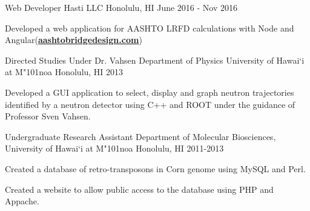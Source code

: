 \begin{cventries}
    \cventry
    {Web Developer}
    {Hasti LLC}
    {Honolulu, HI}
    {June 2016 - Nov 2016}
    {
        \begin{cvitems}
            \item {Developed a web application for AASHTO LRFD calculations with Node and Angular(\textbf{\href{http://www.aashtobridgedesign.com}{aashtobridgedesign.com}})}
        \end{cvitems}
    }

	
	\cventry
	{Directed Studies Under Dr. Vahsen}
	{Department of Physics University of Hawai`i at M{\char"101}noa}
	{Honolulu, HI}
	{2013}
	{
		\begin{cvitems}
			\item {Developed a GUI application to select, display and graph neutron trajectories identified by a neutron detector using C++ and
				ROOT under the guidance of Professor Sven Vahsen.}
		\end{cvitems}
	}

	\cventry
	{Undergraduate Research Assistant}
	{Department of Molecular Biosciences, University of Hawai`i at M{\char"101}noa}
	{Honolulu, HI}
	{2011-2013}
	{
		\begin{cvitems}
			\item {Created a database of retro-transposons in Corn genome using MySQL and Perl.}
			\item {Created a website to allow public access to the database using PHP and Appache.}
		\end{cvitems}
	}

\end{cventries}


